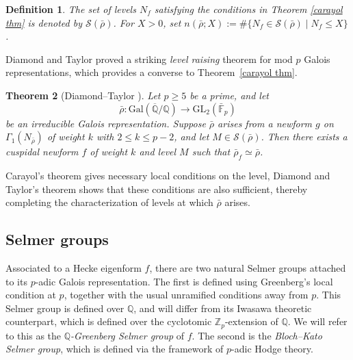 \documentclass[table]{amsart}
\newtheorem{theorem}{Theorem}[section]
\newtheorem{definition}[theorem]{Definition}
\newcommand{\Z}{\mathbb{Z}}
\newcommand{\Q}{\mathbb{Q}}
\newcommand{\F}{\mathbb{F}}
\numberwithin{equation}{section}
\begin{document}
\begin{definition}
The set of levels $N_f$ satisfying the conditions in Theorem \ref{carayol thm} is denoted by $\mathcal{S}(\bar{\rho})$. For $X>0$, set $n(\bar{\rho}; X):=\#\{N_f\in \mathcal{S}(\bar{\rho})\mid N_f\leq X\}$.
\end{definition}
Diamond and Taylor proved a striking \emph{level raising} theorem for mod \( p \) Galois representations, which provides a converse to Theorem~\ref{carayol thm}.

\begin{theorem}[Diamond–Taylor \cite{diamond1994non}]\label{DT theorem}
Let $p \geq 5$ be a prime, and let
\[
\bar{\rho} : \mathrm{Gal}(\overline{\Q}/\Q) \to \mathrm{GL}_2(\bar{\F}_p)
\]
be an irreducible Galois representation. Suppose $\bar{\rho}$ arises from a newform $g$ on $\Gamma_1(N_{\bar{\rho}})$ of weight $k$ with $2 \leq k \leq p-2$, and let $M \in \mathcal{S}(\bar{\rho})$. Then there exists a cuspidal newform $f$ of weight $k$ and level $M$ such that $\bar{\rho}_f \simeq \bar{\rho}$.
\end{theorem}
Carayol's theorem gives necessary local conditions on the level, Diamond and Taylor’s theorem shows that these conditions are also sufficient, thereby completing the characterization of levels at which \( \bar{\rho} \) arises.

\subsection{Selmer groups}
\par  Associated to a Hecke eigenform \( f \), there are two natural Selmer groups attached to its \( p \)-adic Galois representation. The first is defined using Greenberg’s local condition at \( p \), together with the usual unramified conditions away from \( p \). This Selmer group is defined over $\Q$, and will differ from its Iwasawa theoretic counterpart, which is defined over the cyclotomic $\Z_p$-extension of $\Q$. We will refer to this as the \emph{\( \mathbb{Q} \)-Greenberg Selmer group} of \( f \). The second is the \emph{Bloch--Kato Selmer group}, which is defined via the framework of \( p \)-adic Hodge theory.
\end{document}
